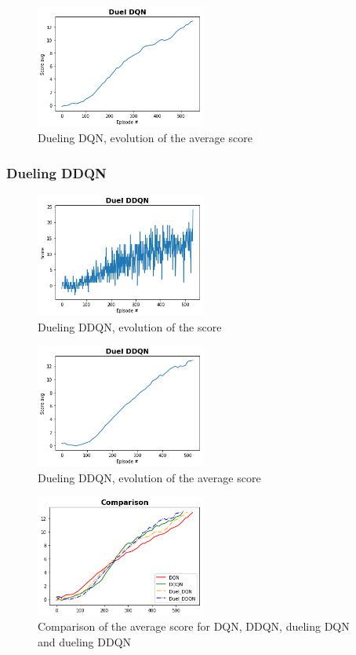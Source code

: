 \documentclass[12pt]{article}
\begin{document}
\begin{figure}[!htbp]
 \centering
  \includegraphics[width=0.5\textwidth]{../PNG/duel_dqn_smooth.png}
  \caption{Dueling DQN, evolution of the average score}
  \label{fig:Duel_DQN_av}
\end{figure}

\subsubsection{Dueling DDQN}

\begin{figure}[!htbp]
 \centering
  \includegraphics[width=0.5\textwidth]{../PNG/duel_ddqn.png}
  \caption{Dueling DDQN, evolution of the score}
  \label{fig:duel_ddqn}
\end{figure}

\begin{figure}[!htbp]
 \centering
  \includegraphics[width=0.5\textwidth]{../PNG/duel_ddqn_smooth.png}
  \caption{Dueling DDQN, evolution of the average score}
  \label{fig:duel_ddqn_av}
\end{figure}

\begin{figure}[!htbp]
 \centering
  \includegraphics[width=0.5\textwidth]{../PNG/Comparison.png}
  \caption{Comparison of the average score for DQN, DDQN, dueling DQN and dueling DDQN}
  \label{fig:comparison}
\end{figure}



{}

\end{document}
